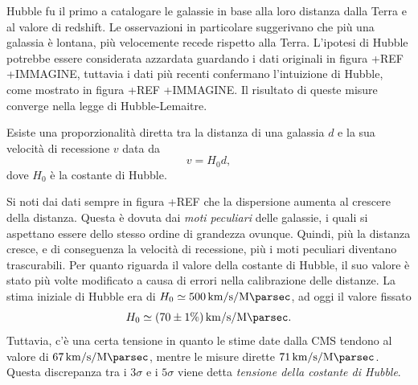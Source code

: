 Hubble fu il primo a catalogare le galassie in base alla loro distanza dalla Terra e al valore di redshift. Le osservazioni in particolare suggerivano che più una galassia è lontana, più velocemente recede rispetto alla Terra. L'ipotesi di Hubble potrebbe essere considerata azzardata guardando i dati originali in figura +REF +IMMAGINE, tuttavia i dati più recenti confermano l'intuizione di Hubble, come mostrato in figura +REF +IMMAGINE. Il risultato di queste misure converge nella legge di Hubble-Lemaitre.
\begin{teo}
    Esiste una proporzionalità diretta tra la distanza di una galassia $d$ e la sua velocità di recessione $v$ data da
    \begin{equation}
        v = H_0d,
    \end{equation}
    dove $H_0$ è la costante di Hubble.
\end{teo}
Si noti dai dati sempre in figura +REF che la dispersione aumenta al crescere della distanza. Questa è dovuta dai \emph{moti peculiari} delle galassie, i quali si aspettano essere dello stesso ordine di grandezza ovunque. Quindi, più la distanza cresce, e di conseguenza la velocità di recessione, più i moti peculiari diventano trascurabili. Per quanto riguarda il valore della costante di Hubble, il suo valore è stato più volte modificato a causa di errori nella calibrazione delle distanze. La stima iniziale di Hubble era di $H_0 \simeq \SI{500}{\kilo\meter\per\second\per\mega\parsec}$, ad oggi il valore fissato 
\begin{equation}
    H_0 \simeq (70 \pm 1\%)\,\unit{\kilo\meter\per\second\per\mega\parsec}.
\end{equation}
Tuttavia, c'è una certa tensione in quanto le stime date dalla CMS tendono al valore di $\SI{67}{\kilo\meter\per\second\per\mega\parsec}$, mentre le misure dirette $\SI{71}{\kilo\meter\per\second\per\mega\parsec}$. Questa discrepanza tra i $3\sigma$ e i $5\sigma$ viene detta \emph{tensione della costante di Hubble}. 

